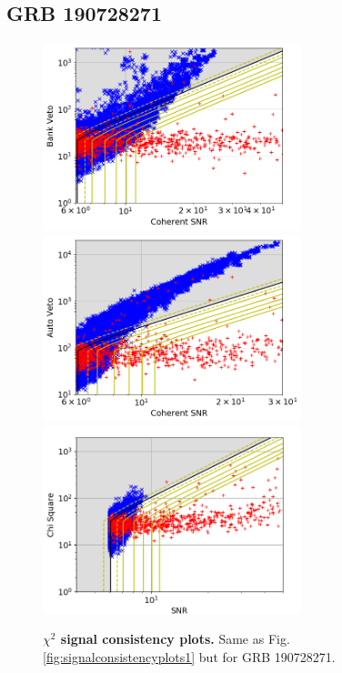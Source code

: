 \documentclass[binding=0.6cm, LaM]{sapthesis}
\begin{document}
\subsection{GRB 190728271}
\label{sec:GRB190728271}
        \begin{figure}[!t]
          \noindent
          \label{scplots2_final}
          \centering
            \includegraphics[width=0.67\textwidth]{GRB190728271_bank_veto_vs_snr_zoom}\\
            \includegraphics[width=0.67\textwidth]{GRB190728271_auto_veto_vs_snr_zoom}\\
            \includegraphics[width=0.67\textwidth]{GRB190728271_chi_square_vs_snr_zoom}%
          \caption{\textbf{$\chi^2$ signal consistency plots.} Same as Fig.\,\ref{fig:signalconsistencyplots1} but for GRB 190728271.}
          \label{fig:scplots2_final}
        \end{figure}
\end{document}
